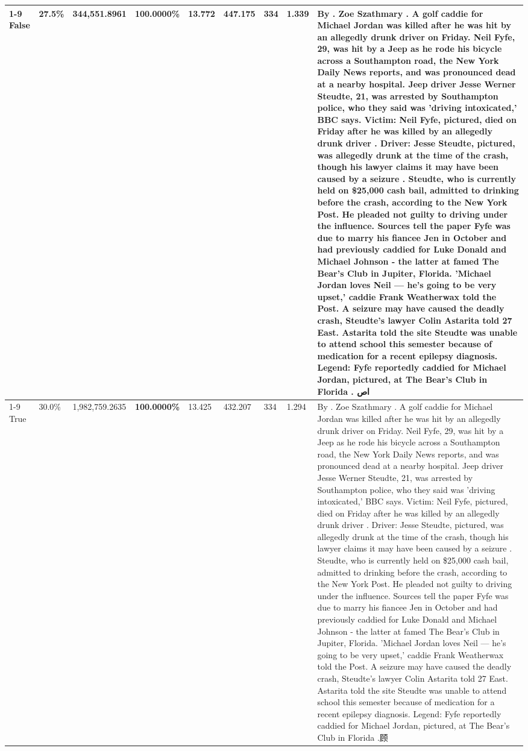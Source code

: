 \begin{table}[H]
\begin{tabular}{lllrlllll}
\cline{1-9}
False & 27.5\% & 344,551.8961 & \bfseries \color{red} 100.0000\% & 13.772 & 447.175 & 334 & 1.339 & By . Zoe Szathmary . A golf caddie for Michael Jordan was killed after he was hit by an allegedly drunk driver on Friday. Neil Fyfe, 29, was hit by a Jeep as he rode his bicycle across a Southampton road, the New York Daily News reports, and was pronounced dead at a nearby hospital. Jeep driver Jesse Werner Steudte, 21, was arrested by Southampton police, who they said was 'driving intoxicated,' BBC says. Victim: Neil Fyfe, pictured, died on Friday after he was killed by an allegedly drunk driver . Driver: Jesse Steudte, pictured, was allegedly drunk at the time of the crash, though his lawyer claims it may have been caused by a seizure . Steudte, who is currently held on \$25,000 cash bail, admitted to drinking before the crash, according to the New York Post. He pleaded not guilty to driving under the influence. Sources tell the paper Fyfe was due to marry his fiancee Jen in October and had previously caddied for Luke Donald and Michael Johnson - the latter at famed The Bear's Club in Jupiter, Florida. 'Michael Jordan loves Neil — he’s going to be very upset,' caddie Frank Weatherwax told the Post. A seizure may have caused the deadly crash, Steudte's lawyer Colin Astarita told 27 East. Astarita told the site Steudte was unable to attend school this semester because of medication for a recent epilepsy diagnosis. Legend: Fyfe reportedly caddied for Michael Jordan, pictured, at The Bear's Club in Florida . اص \\
\cline{1-9}
True & 30.0\% & 1,982,759.2635 & \bfseries \color{red} 100.0000\% & 13.425 & 432.207 & 334 & 1.294 & By . Zoe Szathmary . A golf caddie for Michael Jordan was killed after he was hit by an allegedly drunk driver on Friday. Neil Fyfe, 29, was hit by a Jeep as he rode his bicycle across a Southampton road, the New York Daily News reports, and was pronounced dead at a nearby hospital. Jeep driver Jesse Werner Steudte, 21, was arrested by Southampton police, who they said was 'driving intoxicated,' BBC says. Victim: Neil Fyfe, pictured, died on Friday after he was killed by an allegedly drunk driver . Driver: Jesse Steudte, pictured, was allegedly drunk at the time of the crash, though his lawyer claims it may have been caused by a seizure . Steudte, who is currently held on \$25,000 cash bail, admitted to drinking before the crash, according to the New York Post. He pleaded not guilty to driving under the influence. Sources tell the paper Fyfe was due to marry his fiancee Jen in October and had previously caddied for Luke Donald and Michael Johnson - the latter at famed The Bear's Club in Jupiter, Florida. 'Michael Jordan loves Neil — he’s going to be very upset,' caddie Frank Weatherwax told the Post. A seizure may have caused the deadly crash, Steudte's lawyer Colin Astarita told 27 East. Astarita told the site Steudte was unable to attend school this semester because of medication for a recent epilepsy diagnosis. Legend: Fyfe reportedly caddied for Michael Jordan, pictured, at The Bear's Club in Florida .顾 \\

\end{tabular}
\end{table}
